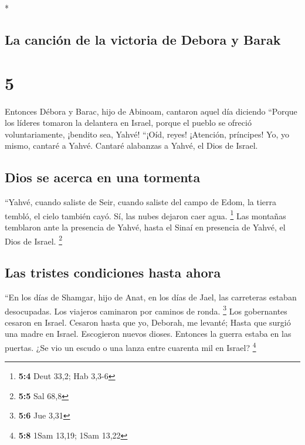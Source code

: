 \begin{paracol}{2}
\begin{otherlanguage}{english}
\end{otherlanguage}

\switchcolumn[0]*

\hypertarget{la-canciuxf3n-de-la-victoria-de-debora-y-barak}{%
\subsection{La canción de la victoria de Debora y
Barak}\label{la-canciuxf3n-de-la-victoria-de-debora-y-barak}}

\hypertarget{section-8}{%
\section{5}\label{section-8}}

 Entonces Débora y Barac, hijo de Abinoam, cantaron aquel
día diciendo  ``Porque los líderes tomaron la delantera en
Israel, porque el pueblo se ofreció voluntariamente, ¡bendito sea,
Yahvé!  ``¡Oíd, reyes! ¡Atención, príncipes! Yo, yo mismo,
cantaré a Yahvé. Cantaré alabanzas a Yahvé, el Dios de Israel.

\hypertarget{dios-se-acerca-en-una-tormenta}{%
\subsection{Dios se acerca en una
tormenta}\label{dios-se-acerca-en-una-tormenta}}

 ``Yahvé, cuando saliste de Seir, cuando saliste del campo
de Edom, la tierra tembló, el cielo también cayó. Sí, las nubes dejaron
caer agua. \footnote{\textbf{5:4} Deut 33,2; Hab 3,3-6} 
Las montañas temblaron ante la presencia de Yahvé, hasta el Sinaí en
presencia de Yahvé, el Dios de Israel. \footnote{\textbf{5:5} Sal 68,8}

\hypertarget{las-tristes-condiciones-hasta-ahora}{%
\subsection{Las tristes condiciones hasta
ahora}\label{las-tristes-condiciones-hasta-ahora}}

 ``En los días de Shamgar, hijo de Anat, en los días de
Jael, las carreteras estaban desocupadas. Los viajeros caminaron por
caminos de ronda. \footnote{\textbf{5:6} Jue 3,31}  Los
gobernantes cesaron en Israel. Cesaron hasta que yo, Deborah, me
levanté; Hasta que surgió una madre en Israel.  Escogieron
nuevos dioses. Entonces la guerra estaba en las puertas. ¿Se vio un
escudo o una lanza entre cuarenta mil en Israel? \footnote{\textbf{5:8}
  1Sam 13,19; 1Sam 13,22}


\end{paracol}
